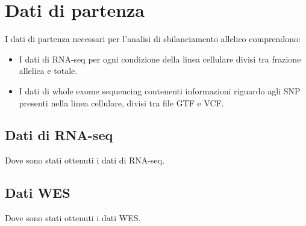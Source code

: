 \section{Dati di partenza}
\label{sec:datiinput}
I dati di partenza necessari per l'analisi di sbilanciamento allelico comprendono:
\begin{itemize}
  \item I dati di RNA-seq per ogni condizione della linea cellulare divisi tra frazione allelica e totale.
  \item I dati di whole exome sequencing contenenti informazioni riguardo agli SNP presenti nella linea cellulare, divisi tra file GTF e VCF.
\end{itemize}

  \subsection{Dati di RNA-seq}
  Dove sono stati ottenuti i dati di RNA-seq.

  \subsection{Dati WES}
  Dove sono stati ottenuti i dati WES.
